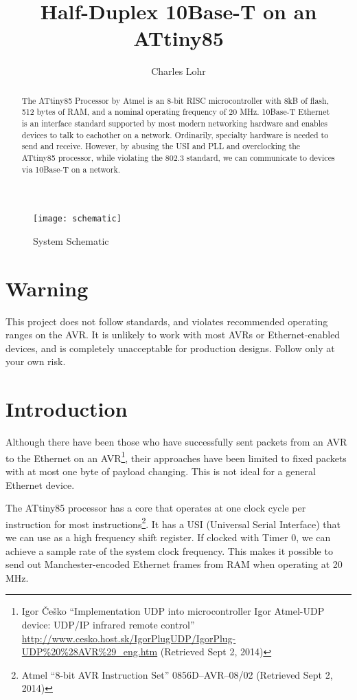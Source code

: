 \documentclass[13pt]{ltxdoc}
\begin{document}
\title{Half-Duplex 10Base-T on an ATtiny85}
\author{Charles Lohr}
\maketitle



\begin{abstract}
The ATtiny85 Processor by Atmel is an 8-bit RISC microcontroller with 8kB of 
flash, 512 bytes of RAM, and a nominal operating frequency of 20 MHz.
10Base-T Ethernet is an interface standard supported by most modern networking
hardware and enables devices to talk to eachother on a network.  Ordinarily,
specialty hardware is needed to send and receive.  However, by abusing
the USI and PLL and overclocking the ATtiny85 processor, while violating the 802.3 standard, we can communicate to devices via 10Base-T on a network.
\end{abstract}

\begin{figure}[ht]
    \centering
    \texttt{[image: schematic]}
    \caption{System Schematic}
	\label{fig:schematic}
\end{figure}

\section*{Warning}
This project does not follow standards, and violates recommended operating ranges on the AVR.  It is unlikely
to work with most AVRs or Ethernet-enabled devices, and is completely unacceptable for production designs.
Follow only at your own risk.
\pagebreak
\section{Introduction}

Although there have been those who have successfully sent packets from an AVR to
the Ethernet on an AVR\footnote{Igor \v{C}e\v{s}ko ``Implementation UDP into microcontroller Igor Atmel-UDP device: UDP/IP infrared remote control'' \url{http://www.cesko.host.sk/IgorPlugUDP/IgorPlug-UDP\%20\%28AVR\%29_eng.htm} (Retrieved Sept 2, 2014)}, their approaches have been limited
to fixed packets with at most one byte of payload changing.  This is not ideal
for a general Ethernet device.

The ATtiny85 processor has a core that operates at one clock cycle per instruction
for most instructions\footnote{Atmel ``8-bit AVR Instruction Set'' 0856D–AVR–08/02 (Retrieved Sept 2, 2014)}.  It has a USI (Universal Serial Interface)
that we can use as a high frequency shift register.  If clocked with Timer 0, 
we can achieve a sample rate of the system clock frequency.  This makes it possible
to send out Manchester-encoded Ethernet frames from RAM when operating at 20 MHz. 
\end{document}

